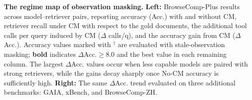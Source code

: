 \begin{table}[t]
\caption{
\textbf{The regime map of observation masking.}
\textbf{Left:} BrowseComp-Plus results across model--retriever pairs, reporting accuracy (Acc.) with and without CM, retriever recall under CM with respect to the gold documents, the additional tool calls per query induced by CM ($\Delta$ calls/q), and the accuracy gain from CM ($\Delta$Acc.). Accuracy values marked with $^\dagger$ are evaluated with stale-observation masking; \textbf{bold} indicates $\Delta\text{Acc.} \geq 8.0$ and the best value in each remaining column. The largest $\Delta$Acc. values occur when less capable models are paired with strong retrievers, while the gains decay sharply once No-CM accuracy is sufficiently high.
\textbf{Right:} The same $\Delta$Acc. trend evaluated on three additional benchmarks: GAIA, xBench, and BrowseComp-ZH.
}
    \vspace{-1em}
\label{tab:main}
\end{table}